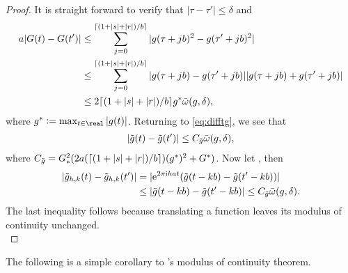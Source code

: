 \begin{appendices}
\begin{proof}
   It is straight forward to verify that  $\vert \tau - \tau' \vert \le \delta$ and 
\begin{align}
a  \vert G(t) - G(t') \vert & \le  \sum_{j = 0}^{\lceil ( 1 + \vert s \vert  +\vert r \vert )/b \rceil} \vert g(\tau + j b)^2 - g(\tau' + j b)^2\vert\notag\\
  & \le \sum_{j = 0}^{\lceil (1 + \vert s \vert  +\vert r\vert )/b \rceil} \vert g(\tau + j b) - g(\tau' + j b) \vert \vert g(\tau + j b) + g(\tau' + j b)\vert\notag\\
  & \le 2 \lceil (1 + \vert s \vert  + \vert r \vert)/b\rceil g^*{\bar{\omega}}({g},\delta),
  \label{}
\end{align}
where $g^* := \max_{t \in \real} \vert g(t)\vert $.
Returning to \eqref{eq:difftg}, we see that
\begin{align}
  \vert \tilde{g}(t) - \tilde{g}(t')\vert \le C_{\tilde{g}} {\bar{\omega}}({g},\delta),\notag
  \label{}
\end{align}
where $C_{\tilde{g}} = G_*^2(2a (\lceil ( 1 + \vert s \vert  +\vert r\vert)/b\rceil)(g^*)^2 + G^*)$. Now let \hkints, then
\begin{align}
  \vert \tilde{g}_{h,k}(t) - \tilde{g}_{h,k}(t')\vert & = \vert \mathrm{e}^{2 \pi \mathrm{i} h a t} (\tilde{g}(t - kb) -\tilde{g}(t'-kb)) \vert\notag\\
  &\le \vert \tilde{g}(t - kb) -\tilde{g}(t'-kb) \vert \le C_{\tilde{g}} {\bar{\omega}}({g},\delta).
  \label{}
\end{align}
The last inequality follows because translating a function leaves its modulus of continuity unchanged.\\
\end{proof}
The following is a simple corollary to \levy's modulus of continuity theorem. 


\end{appendices}
